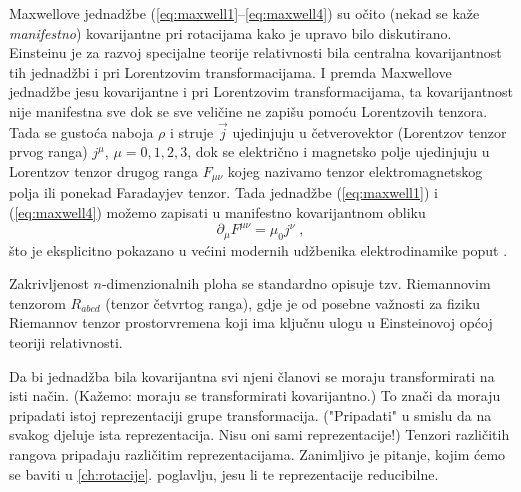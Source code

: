 \begin{primjer}
 Maxwellove jednadžbe (\ref{eq:maxwell1}--\ref{eq:maxwell4}) su očito
 (nekad se kaže \emph{manifestno}) kovarijantne pri rotacijama kako
 je upravo bilo diskutirano. Einsteinu je za razvoj specijalne teorije relativnosti
 bila centralna kovarijantnost tih jednadžbi i pri Lorentzovim
 transformacijama. I premda Maxwellove jednadžbe jesu kovarijantne
 i pri Lorentzovim transformacijama, ta kovarijantnost
 nije manifestna sve dok se sve veličine ne
 zapišu pomoću Lorentzovih tenzora. Tada se gustoća naboja $\rho$ i
 struje $\vec{j}$ ujedinjuju u četverovektor (Lorentzov tenzor prvog
 ranga) $j^{\mu}$, $\mu=0, 1, 2, 3$, dok se električno i magnetsko
 polje ujedinjuju u Lorentzov tenzor drugog ranga
 $F_{\mu\nu}$ kojeg nazivamo tenzor elektromagnetskog polja ili
  ponekad Faradayjev tenzor. Tada jednadžbe (\ref{eq:maxwell1}) i (\ref{eq:maxwell4})
  možemo zapisati u manifestno kovarijantnom obliku
  \begin{equation}
      \partial_{\mu} F^{\mu\nu} = \mu_0 j^{\nu} \;,
      \label{eq:maxwell4D}
  \end{equation}
  što je eksplicitno pokazano u većini modernih udžbenika 
  elektrodinamike poput \cite{Zangwill:2012}.
\end{primjer}

\begin{primjer}
Zakrivljenost $n$-dimenzionalnih ploha se standardno opisuje
tzv. Riemannovim tenzorom $R_{abcd}$  (tenzor četvrtog ranga),
gdje je od posebne važnosti za fiziku Riemannov tenzor prostorvremena
koji ima ključnu ulogu u Einsteinovoj općoj teoriji relativnosti.
\end{primjer}


Da bi jednadžba bila kovarijantna svi njeni članovi se moraju transformirati
na isti način. (Kažemo: moraju se transformirati kovarijantno.)
To znači da moraju pripadati istoj reprezentaciji grupe transformacija.
("Pripadati" u smislu da na svakog djeluje ista reprezentacija. Nisu oni
sami reprezentacije!) Tenzori različitih rangova pripadaju različitim
reprezentacijama. Zanimljivo je pitanje, kojim ćemo se baviti
u \ref{ch:rotacije}. poglavlju, jesu li te reprezentacije reducibilne.
 
